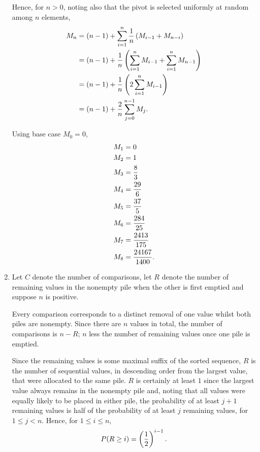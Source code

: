 \documentclass{article}
\begin{document}
\begin{enumerate}
    Hence, for $n>0$, noting also that the pivot is selected uniformly at random among $n$ elements,
    \[\begin{split}
    M_n & = (n-1) + \sum_{i=1}^n \frac{1}{n} \left( M_{i-1} + M_{n-i} \right ) \\
        & = (n-1) + \frac{1}{n} \left( \sum_{i=1}^n M_{i-1} + \sum_{i=1}^n M_{n-1} \right) \\
        & = (n-1) + \frac{1}{n} \left( 2\sum_{i=1}^n M_{i-1} \right) \\
        & = (n-1) + \frac{2}{n} \sum_{j=0}^{n-1} M_j \text.
    \end{split}\]

    Using base case $M_0=0$,
    \[\begin{split}
    M_1 & = 0 \\
    M_2 & = 1 \\
    M_3 & = \frac{8}{3} \\
    M_4 & = \frac{29}{6} \\
    M_5 & = \frac{37}{5} \\
    M_6 & = \frac{284}{25} \\
    M_7 & = \frac{2413}{175} \\
    M_8 & = \frac{24167}{1400} \text.
    \end{split}\]
\item
    Let $C$ denote the number of comparisons,
    let $R$ denote the number of remaining values in the nonempty pile when the other is first emptied
    and suppose $n$ is positive.

    Every comparison corresponds to a distinct removal of one value whilst both piles are nonempty.
    Since there are $n$ values in total, the number of comparisons is $n-R$; $n$ less the number of
    remaining values once one pile is emptied.

    Since the remaining values is some maximal suffix of the sorted sequence, $R$ is the number of sequential
    values, in descending order from the largest value, that were allocated to the same pile. $R$ is
    certainly at least $1$ since the largest value always remains in the nonempty pile and, noting that
    all values were equally likely to be placed in either pile, the probability of at least $j+1$ remaining
    values is half of the probability of at least $j$ remaining values, for $1 \leq j < n$.
    Hence, for $1 \leq i \leq n$,
    \[ P(R \geq i) = \left(\frac{1}{2}\right)^{i-1}\text. \]


\end{enumerate}
\end{document}
